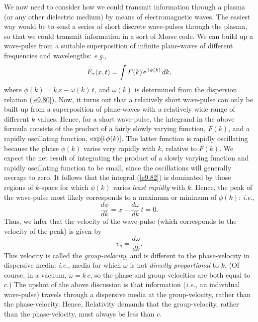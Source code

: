 We  now need to consider how we could transmit information through
a plasma (or any other dielectric medium) by means of electromagnetic
waves. The easiest way would be to send a series of short discrete wave-pulses
through the plasma, so that we could transmit  information in a sort of
Morse code. We can build up a wave-pulse from a suitable
superposition of infinite plane-waves of different frequencies and
wavelengths: {\em e.g.},
\begin{equation}\label{e9.82}
 E_z(x,t) = \int F(k)\,{\rm e}^{\,{\rm i}\,\phi(k)}\,dk,
\end{equation}
where $\phi(k) = k\,x-\omega(k)\,t$, and 
$\omega(k)$ is determined from the dispersion relation 
(\ref{e9.80}). Now, it turns out that a relatively short wave-pulse can only be built up
from a superposition of plane-waves with a relatively wide range of different $k$
values. Hence, for a short wave-pulse, the integrand in the above formula
consists of the product of a fairly slowly varying function, $F(k)$, and
a rapidly oscillating function, $\exp[{\rm i}\,\phi(k)]$. The latter function
is rapidly oscillating because the phase $\phi(k)$ varies very rapidly with $k$,
relative to $F(k)$.
We expect the net result of integrating the product of a slowly varying function and rapidly oscillating function to be  small, since the oscillations will generally average to zero. It follows that the integral
(\ref{e9.82}) is dominated by those regions of $k$-space for which
$\phi(k)$ varies {\em least rapidly}\/ with $k$. Hence, the peak of the wave-pulse
most likely corresponds to a maximum or minimum of $\phi(k)$:
{\em i.e.},
\begin{equation}
\frac{d\phi}{dk} = x - \frac{d\omega}{dk}\,t = 0.
\end{equation}
Thus, we infer that the velocity of the wave-pulse (which corresponds to the velocity of the peak) is given by
\begin{equation}
v_g = \frac{d\omega}{dk}.
\end{equation}
This velocity is called the {\em group-velocity}, and is different to the
phase-velocity in dispersive media: {\em i.e.}, media for which $\omega$ is not {\em directly
proportional}\/ to $k$. (Of course, in a vacuum, $\omega = k\,c$, so the
phase and group velocities are both equal to $c$.) The upshot of the above discussion is that information ({\em i.e.}, an individual wave-pulse)
travels through a dispersive media at the group-velocity, rather than the
phase-velocity. Hence, Relativity demands that the group-velocity, rather
than the phase-velocity,  must
always be less than $c$. 

